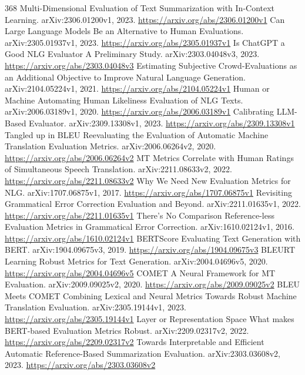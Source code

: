 \documentclass[11pt]{article}
\begin{document}
\begin{thebibliography}{368}
 Multi-Dimensional Evaluation of Text Summarization with In-Context Learning. arXiv:2306.01200v1, 2023. \url{https://arxiv.org/abs/2306.01200v1}
 Can Large Language Models Be an Alternative to Human Evaluations. arXiv:2305.01937v1, 2023. \url{https://arxiv.org/abs/2305.01937v1}
 Is ChatGPT a Good NLG Evaluator A Preliminary Study. arXiv:2303.04048v3, 2023. \url{https://arxiv.org/abs/2303.04048v3}
 Estimating Subjective Crowd-Evaluations as an Additional Objective to Improve Natural Language Generation. arXiv:2104.05224v1, 2021. \url{https://arxiv.org/abs/2104.05224v1}
 Human or Machine Automating Human Likeliness Evaluation of NLG Texts. arXiv:2006.03189v1, 2020. \url{https://arxiv.org/abs/2006.03189v1}
 Calibrating LLM-Based Evaluator. arXiv:2309.13308v1, 2023. \url{https://arxiv.org/abs/2309.13308v1}
 Tangled up in BLEU Reevaluating the Evaluation of Automatic Machine Translation Evaluation Metrics. arXiv:2006.06264v2, 2020. \url{https://arxiv.org/abs/2006.06264v2}
 MT Metrics Correlate with Human Ratings of Simultaneous Speech Translation. arXiv:2211.08633v2, 2022. \url{https://arxiv.org/abs/2211.08633v2}
 Why We Need New Evaluation Metrics for NLG. arXiv:1707.06875v1, 2017. \url{https://arxiv.org/abs/1707.06875v1}
 Revisiting Grammatical Error Correction Evaluation and Beyond. arXiv:2211.01635v1, 2022. \url{https://arxiv.org/abs/2211.01635v1}
 There's No Comparison Reference-less Evaluation Metrics in Grammatical Error Correction. arXiv:1610.02124v1, 2016. \url{https://arxiv.org/abs/1610.02124v1}
 BERTScore Evaluating Text Generation with BERT. arXiv:1904.09675v3, 2019. \url{https://arxiv.org/abs/1904.09675v3}
 BLEURT Learning Robust Metrics for Text Generation. arXiv:2004.04696v5, 2020. \url{https://arxiv.org/abs/2004.04696v5}
 COMET A Neural Framework for MT Evaluation. arXiv:2009.09025v2, 2020. \url{https://arxiv.org/abs/2009.09025v2}
 BLEU Meets COMET Combining Lexical and Neural Metrics Towards Robust Machine Translation Evaluation. arXiv:2305.19144v1, 2023. \url{https://arxiv.org/abs/2305.19144v1}
 Layer or Representation Space What makes BERT-based Evaluation Metrics Robust. arXiv:2209.02317v2, 2022. \url{https://arxiv.org/abs/2209.02317v2}
 Towards Interpretable and Efficient Automatic Reference-Based Summarization Evaluation. arXiv:2303.03608v2, 2023. \url{https://arxiv.org/abs/2303.03608v2}

\end{thebibliography}
\end{document}
